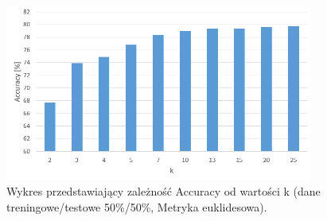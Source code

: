 \documentclass{classrep}
\begin{document}
\begin{figure}[h!]
	\centering
	\includegraphics[width=0.9\textwidth]{accuracyK.png}
	\caption{Wykres przedstawiający zależność Accuracy od wartości k (dane treningowe/testowe 50\%/50\%, Metryka euklidesowa).}
	\label{accuracyK}
\end{figure}

\newpage
\end{document}
